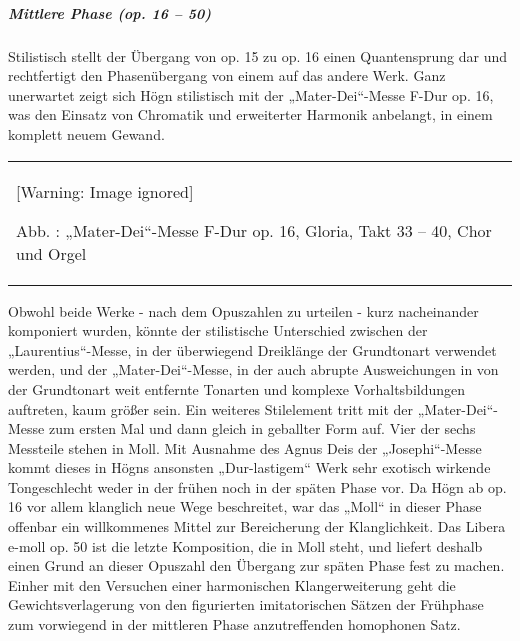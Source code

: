 \documentclass[a4paper]{article}
\newcounter{Abb}
\renewcommand\theAbb{\arabic{Abb}}
\begin{document}
\subparagraph{Mittlere Phase (op. 16 – 50)}
Stilistisch stellt der Übergang von op. 15 zu op. 16 einen Quantensprung
dar und rechtfertigt den Phasenübergang von einem auf das andere Werk.
Ganz unerwartet zeigt sich Högn stilistisch mit der „Mater-Dei“-Messe
F-Dur op. 16, was den Einsatz von Chromatik und erweiterter Harmonik
anbelangt, in einem komplett neuem Gewand.

\begin{center}
\tablefirsthead{}
\tablehead{}
\tabletail{}
\tablelasttail{}
\begin{supertabular}{m{12.027cm}}
  [Warning: Image ignored] %
 
\label{bkm:Ref99946240}Abb. \stepcounter{Abb}{\theAbb}:
„Mater-Dei“-Messe F-Dur op. 16, Gloria, Takt  33 – 40, Chor und Orgel\\
\end{supertabular}
\end{center}
Obwohl beide Werke - nach dem Opuszahlen zu urteilen - kurz nacheinander
komponiert wurden, könnte der stilistische Unterschied zwischen der
„Laurentius“-Messe, in der überwiegend Dreiklänge der Grundtonart
verwendet werden, und der „Mater-Dei“-Messe, in der auch abrupte
Ausweichungen in von der Grundtonart weit entfernte Tonarten und
komplexe Vorhaltsbildungen auftreten, kaum größer sein. Ein weiteres
Stilelement tritt mit der „Mater-Dei“-Messe zum ersten Mal und dann
gleich in geballter Form auf. Vier der sechs Messteile stehen in Moll.
Mit Ausnahme des Agnus Deis der „Josephi“-Messe kommt dieses in Högns
ansonsten „Dur-lastigem“ Werk sehr exotisch wirkende Tongeschlecht
weder in der frühen noch in der späten Phase vor. Da Högn ab op. 16 vor
allem klanglich neue Wege beschreitet, war das „Moll“ in dieser Phase
offenbar ein willkommenes Mittel zur Bereicherung der Klanglichkeit.
Das Libera e-moll op. 50 ist die letzte Komposition, die in Moll steht,
und liefert deshalb einen Grund an dieser Opuszahl den Übergang zur
späten Phase fest zu machen. Einher mit den Versuchen einer
harmonischen Klangerweiterung geht die Gewichtsverlagerung von den
figurierten imitatorischen Sätzen der Frühphase zum vorwiegend in der
mittleren Phase anzutreffenden homophonen Satz.
\end{document}

